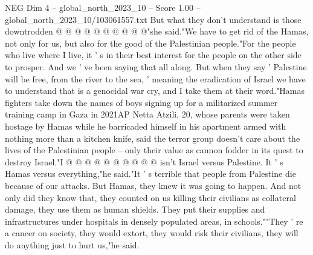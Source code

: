 \begin{textsample}{NEG Dim 4 – global\_north\_2023\_10 – Score 1.00 – global\_north\_2023\_10/103061557.txt}
But what they don't understand is those downtrodden @ @ @ @ @ @ @ @ @ @"she said."We have to get rid of the Hamas, not only for us, but also for the good of the Palestinian people."For the people who live where I live, it ' s in their best interest for the people on the other side to prosper.
And we ' ve been saying that all along.
But when they say ' Palestine will be free, from the river to the sea, ' meaning the eradication of Israel we have to understand that is a genocidal war cry, and I take them at their word."Hamas fighters take down the names of boys signing up for a militarized summer training camp in Gaza in 2021AP Netta Atzili, 20, whose parents were taken hostage by Hamas while he barricaded himself in his apartment armed with nothing more than a kitchen knife, said the terror group doesn't care about the lives of the Palestinian people -- only their value as cannon fodder in its quest to destroy Israel."I @ @ @ @ @ @ @ @ @ @ isn't Israel versus Palestine.
It ' s Hamas versus everything,"he said."It ' s terrible that people from Palestine die because of our attacks.
But Hamas, they knew it was going to happen.
And not only did they know that, they counted on us killing their civilians as collateral damage, they use them as human shields.
They put their supplies and infrastructures under hospitals in densely populated areas, in schools.""They ' re a cancer on society, they would extort, they would risk their civilians, they will do anything just to hurt us,"he said.

\end{textsample}
